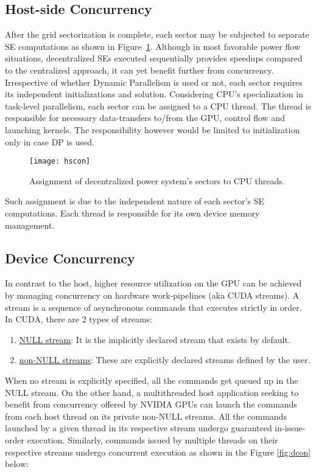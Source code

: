 \documentclass[thesis.tex]{subfiles}
\begin{document}
\subsection{Host-side Concurrency }
After the grid sectorization is complete, each sector may be subjected to separate SE computations as shown in Figure~\ref{fig:hscon}. Although in most favorable power flow situations, decentralized SEs executed sequentially provides speedups compared to the centralized approach, it can yet benefit further from concurrency. Irrespective of whether Dynamic Parallelism is used or not, each sector requires its independent initializations and solution. Considering CPU’s specialization in task-level parallelism, each sector can be assigned to a CPU thread. The thread is responsible for necessary data-transfers to/from the GPU, control flow and launching kernels. The responsibility however would be limited to initialization only in case DP is used.
\begin{figure}[H]
	\centering
	\texttt{[image: hscon]}
	\caption{Assignment of decentralized power system’s sectors to CPU threads.}
	\label{fig:hscon}
\end{figure}

Such assignment is due to the independent nature of each sector’s SE computations. Each thread is responsible for its own device memory management. 

\subsection{Device Concurrency}
In contrast to the host, higher resource utilization on the GPU can be achieved by managing concurrency on hardware work-pipelines (aka CUDA streams). A stream is a sequence of asynchronous commands that executes strictly in order. In CUDA, there are 2 types of streams:
\begin{enumerate}
	\item \underline{NULL stream}: It is the implicitly declared stream that exists by default.
	\item \underline{non-NULL streams}: These are explicitly declared streams defined by the user.
\end{enumerate}
When no stream is explicitly specified, all the commands get queued up in the NULL stream. On the other hand, a multithreaded host application seeking to benefit from concurrency offered by NVIDIA GPUs can launch the commands from each host thread on its private non-NULL streams. All the commands launched by a given thread in its respective stream undergo guaranteed in-issue-order execution. Similarly, commands issued by multiple threads on their respective streams undergo concurrent execution as shown in the Figure \ref{fig:dcon} below:
\end{document}
